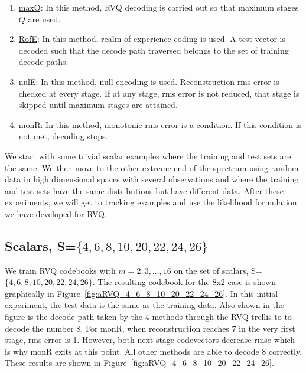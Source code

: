 \begin{enumerate}
\item \underline{maxQ}: In this method, RVQ decoding is carried out so that maximum stages $Q$ are used.
\item \underline{RofE}: In this method, realm of experience coding is used.  A test vector is decoded such that the decode path traversed belongs to the set of training decode paths.
\item \underline{nulE}: In this method, null encoding is used.  Reconstruction rms error is checked at every stage.  If at any stage, rms error is not reduced, that stage is skipped until maximum stages are attained.
\item \underline{monR}: In this method, monotonic rms error is a condition.  If this condition is not met, decoding stops.
\end{enumerate}

We start with some trivial scalar examples where the training and test sets are the same.  We then move to the other extreme end of the spectrum using random data in high dimensional spaces with several observations and where the training and test sets have the same distributions but have different data.  After these experiments, we will get to tracking examples and use the likelihood formulation we have developed for RVQ.



\subsection{Scalars, S=$\{4, 6, 8, 10, 20, 22, 24, 26\}$}
We train RVQ codebooks with $m=2, 3, \ldots, 16$ on the set of scalars, S=$\{4, 6, 8, 10, 20, 22, 24, 26\}$.  The resulting codebook for the 8x2 case is shown graphically in Figure~\ref{fig:aRVQ_4_6_8_10_20_22_24_26}.  In this initial experiment, the test data is the same as the training data.  Also shown in the figure is the decode path taken by the 4 methods through the RVQ trellis to to decode the number 8.  For monR, when reconstruction reaches 7 in the very first stage, rms error is 1.  However, both next stage codevectors decrease rmse which is why monR exits at this point.  All other methods are able to decode 8 correctly.  These results are shown in Figure~\ref{fig:aRVQ_4_6_8_10_20_22_24_26}.  
  
 
